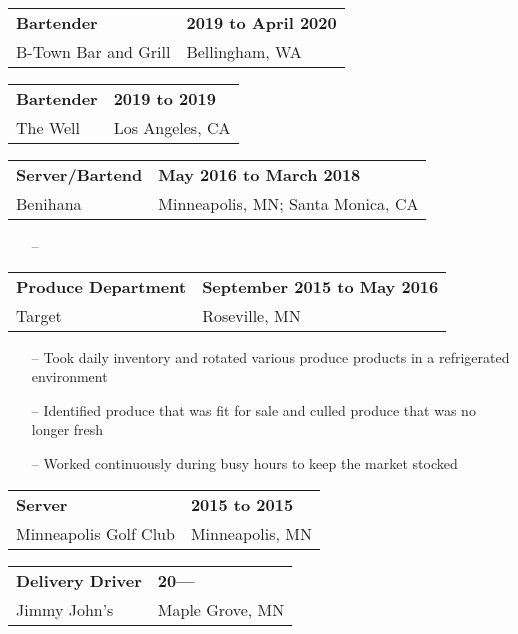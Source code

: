\documentclass[11pt,letterpaper]{article}
\begin{document}
\begin{tabularx}{\textwidth}{lX}
    \textbf{Bartender} & \hfill \textbf{2019 to April 2020} \\[3.75pt]
    B-Town Bar and Grill & \hfill Bellingham, WA \\[3.75pt]
\end{tabularx}

\begin{tabularx}{\textwidth}{lX}
    \textbf{Bartender} & \hfill \textbf{2019 to 2019} \\[3.75pt]
    The Well & \hfill Los Angeles, CA \\[3.75pt]
\end{tabularx}

\begin{tabularx}{\textwidth}{lX}
    \textbf{Server/Bartend} & \hfill \textbf{May 2016 to March 2018} \\
    Benihana & \hfill Minneapolis, MN; Santa Monica, CA\\
\end{tabularx}
\begin{itemize}
    \item[--] 
\end{itemize}

\begin{tabularx}{\textwidth}{lX}
    \textbf{Produce Department} & \hfill \textbf{September 2015 to May 2016} \\[3.75pt]
    Target & \hfill Roseville, MN \\[3.75pt]
\end{tabularx}
\begin{itemize}
    \item[--] Took daily inventory and rotated various produce products in a refrigerated environment 
    \item[--] Identified produce that was fit for sale and culled produce that was no longer fresh 
    \item[--] Worked continuously during busy hours to keep the market stocked 
\end{itemize}

\begin{tabularx}{\textwidth}{lX}
    \textbf{Server} & \hfill \textbf{2015 to 2015} \\[3.75pt]
    Minneapolis Golf Club & \hfill Minneapolis, MN \\[3.75pt]
\end{tabularx}

\begin{tabularx}{\textwidth}{lX}
    \textbf{Delivery Driver} & \hfill \textbf{20—} \\[3.75pt]
    Jimmy John's & \hfill Maple Grove, MN \\[3.75pt]
\end{tabularx}
\end{document}
